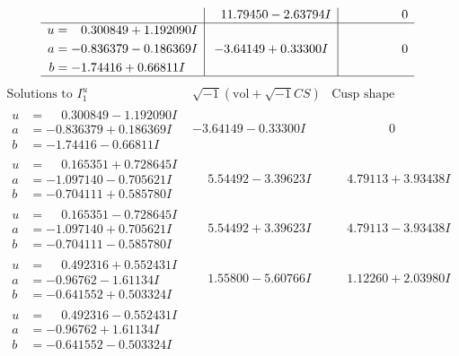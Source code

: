 \documentclass[1p]{elsarticle_modified}
\theoremstyle{definition}
\newcommand{\I}{\sqrt{-1}}
\begin{document}
$$\begin{array}{c|c|c}
 & \phantom{-}11.79450 - 2.63794 I & \phantom{-0.000000 } 0 \\ \hline\begin{aligned}
u &= \phantom{-}0.300849 + 1.192090 I \\
a &= -0.836379 - 0.186369 I \\
b &= -1.74416 + 0.66811 I\end{aligned}
 & -3.64149 + 0.33300 I & \phantom{-0.000000 } 0\\
 \hline 
 \end{array}$$\newpage$$\begin{array}{c|c|c}  
\text{Solutions to }I^u_{1}& \I (\text{vol} + \sqrt{-1}CS) & \text{Cusp shape}\\
 \hline 
\begin{aligned}
u &= \phantom{-}0.300849 - 1.192090 I \\
a &= -0.836379 + 0.186369 I \\
b &= -1.74416 - 0.66811 I\end{aligned}
 & -3.64149 - 0.33300 I & \phantom{-0.000000 } 0 \\ \hline\begin{aligned}
u &= \phantom{-}0.165351 + 0.728645 I \\
a &= -1.097140 - 0.705621 I \\
b &= -0.704111 + 0.585780 I\end{aligned}
 & \phantom{-}5.54492 - 3.39623 I & \phantom{-}4.79113 + 3.93438 I \\ \hline\begin{aligned}
u &= \phantom{-}0.165351 - 0.728645 I \\
a &= -1.097140 + 0.705621 I \\
b &= -0.704111 - 0.585780 I\end{aligned}
 & \phantom{-}5.54492 + 3.39623 I & \phantom{-}4.79113 - 3.93438 I \\ \hline\begin{aligned}
u &= \phantom{-}0.492316 + 0.552431 I \\
a &= -0.96762 - 1.61134 I \\
b &= -0.641552 + 0.503324 I\end{aligned}
 & \phantom{-}1.55800 - 5.60766 I & \phantom{-}1.12260 + 2.03980 I \\ \hline\begin{aligned}
u &= \phantom{-}0.492316 - 0.552431 I \\
a &= -0.96762 + 1.61134 I \\
b &= -0.641552 - 0.503324 I\end{aligned}

\end{array}$$
\end{document}
